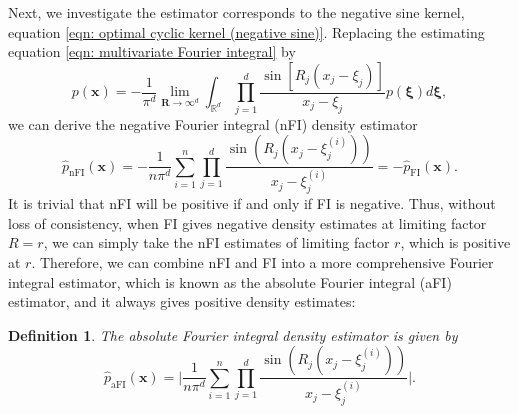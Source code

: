 \documentclass[%
 reprint,
 amsmath,amssymb,
 aps,
]{revtex4-2}
\newtheorem{definition}[theorem]{Definition}
\def\R{\mathbb{R}}
\def\bxi{\boldsymbol{\xi}}
\def\bxi{\boldsymbol{\xi}}
\def\xbold{\mathbf{x}}
\def\Rbold{\mathbf{R}}
\begin{document}
Next, we investigate the estimator corresponds to the negative sine kernel, equation 
\eqref{eqn: optimal cyclic kernel (negative sine)}. Replacing the estimating equation \eqref{eqn: multivariate Fourier integral} by
\begin{equation} \label{eqn: negative multivariate Fourier integral}
    p(\xbold) = -\frac{1}{\pi^d} \lim_{\Rbold \to \infty^d} \int_{\R^d} \prod_{j=1}^d \frac{\sin[R_j(x_j-\xi_j)]}{x_j-\xi_j} p(\bxi)d\bxi,
\end{equation}
we can derive the negative Fourier integral (nFI) density estimator
\begin{equation} \label{eqn: multivariate negative Fourier integral density estimator}
    \hat{p}_\text{nFI}(\mathbf{x}) = -\frac{1}{n\pi^d}\sum_{i = 1}^n \prod_{j = 1}^d \frac{\sin(R_j(x_j - \xi_j^{(i)}))}{x_j - \xi_j^{(i)}} = -\hat{p}_\text{FI}(\mathbf{x}).
\end{equation}
It is trivial that nFI will be positive if and only if FI is negative. Thus, without loss of consistency, when FI gives negative density estimates at limiting factor $R=r$, we can simply take the nFI estimates of limiting factor $r$, which is positive at $r$. Therefore, we can combine nFI and FI into a more comprehensive Fourier integral estimator, which is known as the absolute Fourier integral (aFI) estimator, and it always gives positive density estimates:
\begin{definition}
    The absolute Fourier integral density estimator is given by
    \begin{equation} \label{eqn: absolute Fourier integral estimator}
        \hat{p}_\text{aFI}(\mathbf{x}) = \bigg|\frac{1}{n\pi^d}\sum_{i = 1}^n \prod_{j = 1}^d \frac{\sin(R_j(x_j - \xi_j^{(i)}))}{x_j - \xi_j^{(i)}}\bigg|.
    \end{equation}
\end{definition}
\end{document}
